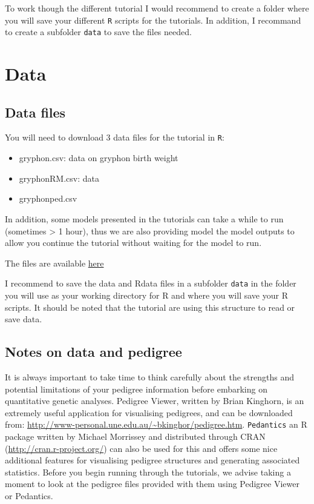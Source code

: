 \documentclass[
  12pt,
]{book}
\providecommand{\tightlist}{%
  \setlength{\itemsep}{0pt}\setlength{\parskip}{0pt}}
\begin{document}
To work though the different tutorial I would recommend to create a folder where you will save your different \texttt{R} scripts for the tutorials. In addition, I recommand to create a subfolder \texttt{data} to save the files needed.

\hypertarget{data}{%
\section{Data}\label{data}}

\hypertarget{data-files}{%
\subsection{Data files}\label{data-files}}

You will need to download 3 data files for the tutorial in \texttt{R}:

\begin{itemize}
\tightlist
\item
  gryphon.csv: data on gryphon birth weight
\item
  gryphonRM.csv: data
\item
  gryphonped.csv
\end{itemize}

In addition, some models presented in the tutorials can take a while to run (sometimes \textgreater{} 1 hour), thus we are also providing model the model outputs to allow you continue the tutorial without waiting for the model to run.

The files are available \href{https://github.com/JulienGAMartin/wam_tuto/tree/master/data}{here}

I recommend to save the data and Rdata files in a subfolder \texttt{data} in the folder you will use as your working directory for R and where you will save your R scripts. It should be noted that the tutorial are using this structure to read or save data.

\hypertarget{notes-on-data-and-pedigree}{%
\subsection{Notes on data and pedigree}\label{notes-on-data-and-pedigree}}

It is always important to take time to think carefully about the strengths and potential limitations of your pedigree information before embarking on quantitative genetic analyses. Pedigree Viewer, written by Brian Kinghorn, is an extremely useful application for visualising pedigrees, and can be downloaded from: \url{http://www-personal.une.edu.au/~bkinghor/pedigree.htm}. \texttt{Pedantics} an R package written by Michael Morrissey and distributed through CRAN (\url{http://cran.r-project.org/}) can also be used for this and offers some nice additional features for visualising pedigree structures and generating associated statistics. Before you begin running through the tutorials, we advise taking a moment to look at the pedigree files provided with them using Pedigree Viewer or Pedantics.
\end{document}
